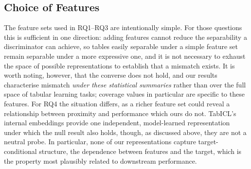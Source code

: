 \documentclass{article}
\begin{document}
\subsection{Choice of Features}
\label{sec:feature:simplicity}

The feature sets used in RQ1–RQ3 are intentionally simple. 
For those questions this is sufficient in one direction: adding features cannot reduce the separability a discriminator can achieve, so tables easily separable under a simple feature set remain separable under a more expressive one, and it is not necessary to exhaust the space of possible representations to establish that a mismatch exists.
It is worth noting, however, that the converse does not hold, and our results characterise mismatch \textit{under these statistical summaries} rather than over the full space of tabular learning tasks; coverage values in particular are specific to these features.
For RQ4 the situation differs, as a richer feature set could reveal a relationship between proximity and performance which ours do not.
TabICL's internal embeddings provide one independent, model-learned representation under which the null result also holds, though, as discussed above, they are not a neutral probe.
In particular, none of our representations capture target-conditional structure, the dependence between features and the target, which is the property most plausibly related to downstream performance.



\end{document}
